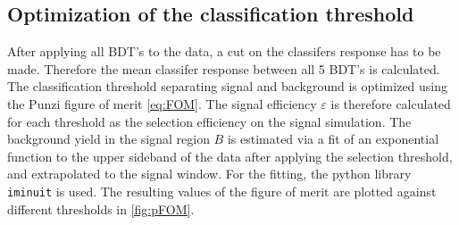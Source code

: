 \subsection{Optimization of the classification threshold}
After applying all BDT's to the data, a cut on the classifers response has to be made. Therefore the mean classifer response between all 5 BDT's is calculated.
The classification threshold separating signal and background is optimized using the Punzi figure of merit \autoref{eq:FOM}.
The signal efficiency $\varepsilon$ is therefore calculated for each threshold as the selection efficiency on the signal simulation. The background yield in the signal region $B$
is estimated via a fit of an exponential function to the upper sideband of the data after applying the selection threshold, and extrapolated to the signal window.
For the fitting, the python library \texttt{iminuit} \cite{iminuit} is used.
The resulting values of the figure of merit are plotted against different thresholds in \autoref{fig:pFOM}.
